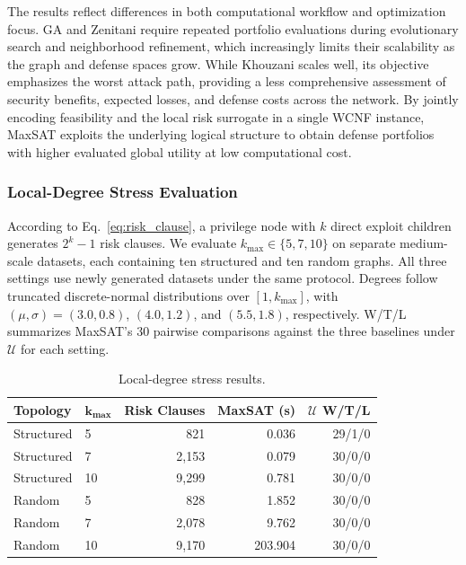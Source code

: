 \documentclass[conference]{IEEEtran}
\theoremstyle{definition} %
\theoremstyle{plain} %
\begin{document}
{The results reflect differences in both computational workflow and optimization focus. GA and Zenitani require repeated portfolio evaluations during evolutionary search and neighborhood refinement, which increasingly limits their scalability as the graph and defense spaces grow. While Khouzani scales well, its objective emphasizes the worst attack path, providing a less comprehensive assessment of security benefits, expected losses, and defense costs across the network. By jointly encoding feasibility and the local risk surrogate in a single WCNF instance, MaxSAT exploits the underlying logical structure to obtain defense portfolios with higher evaluated global utility at low computational cost.

\subsubsection{Local-Degree Stress Evaluation}

According to Eq.~\eqref{eq:risk_clause}, a privilege node with \(k\) direct exploit children generates \(2^k-1\) risk clauses. We evaluate \(k_{\max}\in\{5,7,10\}\) on separate medium-scale datasets, each containing ten structured and ten random graphs. All three settings use newly generated datasets under the same protocol. Degrees follow truncated discrete-normal distributions over \([1,k_{\max}]\), with \((\mu,\sigma)=(3.0,0.8)\), \((4.0,1.2)\), and \((5.5,1.8)\), respectively. W/T/L summarizes MaxSAT's 30 pairwise comparisons against the three baselines under \(\mathcal{U}\) for each setting.

\begin{table}[t]
\centering
\caption{Local-degree stress results.}
\label{tab:k_stress}
\footnotesize
\setlength{\tabcolsep}{3pt}
\renewcommand{\arraystretch}{1.1}
\begin{tabular}{llrrr}
\toprule
\textbf{Topology} &
\(\boldsymbol{k_{\max}}\) &
\textbf{Risk Clauses} &
\textbf{MaxSAT (s)} &
\(\boldsymbol{\mathcal{U}}\) \textbf{W/T/L} \\
\midrule
Structured & 5  & 821   & 0.036   & 29/1/0 \\
Structured & 7  & 2,153 & 0.079   & 30/0/0 \\
Structured & 10 & 9,299 & 0.781   & 30/0/0 \\
Random     & 5  & 828   & 1.852   & 30/0/0 \\
Random     & 7  & 2,078 & 9.762   & 30/0/0 \\
Random     & 10 & 9,170 & 203.904 & 30/0/0 \\
\bottomrule
\end{tabular}
\end{table}

}
\end{document}
